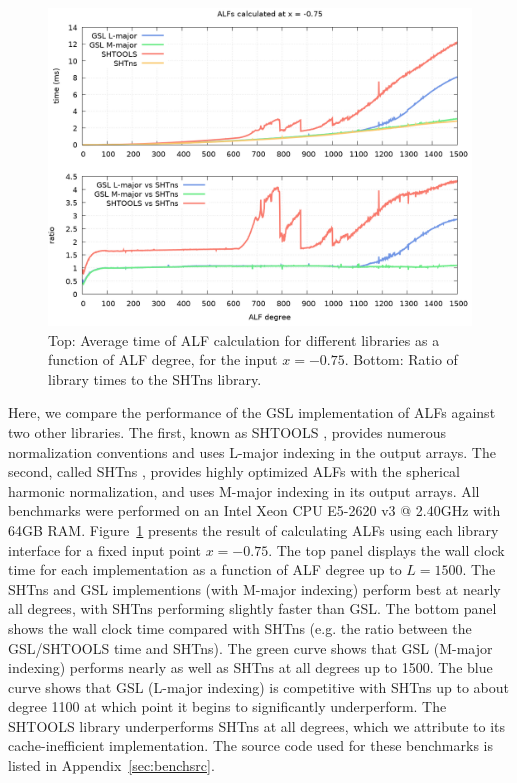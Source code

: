 \documentclass[12pt]{article}
\begin{document}
\begin{figure}[ht]
\includegraphics[width=\textwidth]{plots/bench.png}
\caption{Top: Average time of ALF calculation for different libraries as a function of ALF
degree, for the input $x = -0.75$. Bottom: Ratio of library times to the SHTns library.}
\label{fig:bench}
\end{figure}

Here, we compare the performance of the GSL implementation of ALFs
against two other libraries. The first, known as SHTOOLS
\citep{wieczorek2018}, provides numerous normalization conventions
and uses L-major indexing in the output arrays. The second,
called SHTns \citep{schaeffer2013}, provides highly optimized ALFs
with the spherical harmonic normalization, and uses M-major indexing
in its output arrays. All benchmarks were performed on an Intel Xeon
CPU E5-2620 v3 @ 2.40GHz with 64GB RAM. Figure~\ref{fig:bench} presents the result of
calculating ALFs using each library interface for a fixed input point
$x = -0.75$. The top panel displays the wall clock time for each
implementation as a function of ALF degree up to $L = 1500$. The
SHTns and GSL implementions (with M-major indexing) perform best at
nearly all degrees, with SHTns performing slightly faster than GSL.
The bottom panel shows the wall clock time compared with SHTns (e.g.
the ratio between the GSL/SHTOOLS time and SHTns). The green
curve shows that GSL (M-major indexing) performs nearly as well as SHTns
at all degrees up to 1500. The blue curve shows that GSL (L-major indexing)
is competitive with SHTns up to about degree 1100 at which point it
begins to significantly underperform. The SHTOOLS library underperforms
SHTns at all degrees, which we attribute to its cache-inefficient implementation.
The source code used for these benchmarks is listed in Appendix~\ref{sec:benchsrc}.
\end{document}
